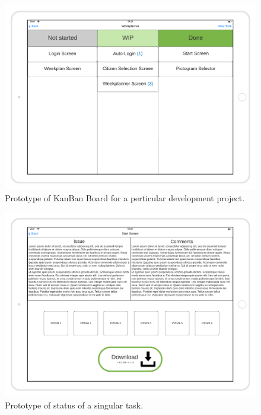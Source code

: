 \begin{figure}[H]
    \includegraphics[width=\textwidth]{images/KanBan-mockup.png}
    \caption{Prototype of KanBan Board for a perticular development project.}
\end{figure}

\begin{figure}[H]
    \includegraphics[width=\textwidth]{images/view-a-task-mockup.png}
    \caption{Prototype of status of a singular task.}
\end{figure}

